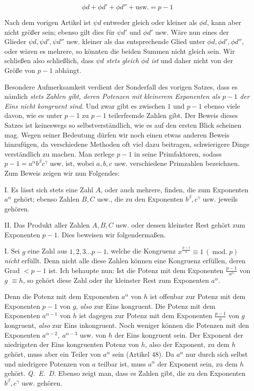 \[\phi d+\phi d'+\phi d''+\text{usw.}=p-1\]

Nach dem vorigen Artikel ist $\psi d$ entweder gleich oder kleiner als $\phi d$, kann aber nicht größer sein; ebenso gilt dies für $\psi d'$ und $\phi d'$ usw. Wäre nun eines der Glieder $\psi d,\psi d',\psi d''$ usw. kleiner als das entsprechende Glied unter $\phi d,\phi d',\phi d''$, oder wären es mehrere, so könnten die beiden Summen nicht gleich sein. Wir schließen also schließlich, dass $\psi d$ \emph{stets gleich $\phi d$ ist} und daher nicht von der Größe von $p-1$ abhängt.


Besondere Aufmerksamkeit verdient der Sonderfall des vorigen Satzes, dass es nämlich \emph{stets Zahlen gibt, deren Potenzen mit kleinerem Exponenten als $p-1$ der Eins nicht kongruent sind}. Und zwar gibt es zwischen $1$ und $p-1$ ebenso viele davon, wie es unter $p-1$ zu $p-1$ teilerfremde Zahlen gibt. Der Beweis dieses Satzes ist keineswegs so selbstverständlich, wie es auf den ersten Blick scheinen mag. Wegen seiner Bedeutung dürfen wir noch einen etwas anderen Beweis hinzufügen, da verschiedene Methoden oft viel dazu beitragen, schwierigere Dinge verständlich zu machen. Man zerlege $p-1$ in seine Primfaktoren, sodass $p-1=a^\alpha b^\beta c^\gamma$ usw. ist, wobei $a,b,c$ usw. verschiedene Primzahlen bezeichnen. Zum Beweis zeigen wir nun Folgendes:

I. Es lässt sich stets eine Zahl $A$, oder auch mehrere, finden, die zum Exponenten $a^\alpha$ gehört; ebenso Zahlen $B,C$ usw., die zu den Exponenten $b^\beta,c^\gamma$ usw. jeweils gehören.

II. Das Produkt aller Zahlen $A,B,C$ usw. oder dessen kleinster Rest gehört zum Exponenten $p-1$. Dies beweisen wir folgendermaßen.

I. Sei $g$ eine Zahl aus $1,2,3\ldots p-1$, welche die Kongruenz $x^{\frac{p-1}{a}}\equiv1\,(\operatorname{mod.}p)$ \emph{nicht} erfüllt. Denn nicht alle diese Zahlen können eine Kongruenz erfüllen, deren Grad $<p-1$ ist. Ich behaupte nun: Ist die Potenz mit dem Exponenten ${\frac{p-1}{a^\alpha}}$ von $g$ $\equiv h$, so gehört diese Zahl oder ihr kleinster Rest zum Exponenten $a^\alpha$.

Denn die Potenz mit dem Exponenten $a^{\alpha}$ von $h$ ist offenbar zur Potenz mit dem Exponenten $p-1$ von $g$, \emph{also} zur Eins kongruent. Die Potenz mit dem Exponenten $a^{\alpha-1}$ von $h$ ist dagegen zur Potenz mit dem Exponenten ${\frac{p-1}{a}}$ von $g$ kongruent, \emph{also} zur Eins inkongruent. Noch weniger können die Potenzen mit den Exponenten $a^{\alpha-2},\ a^{\alpha-3}$ usw. von $h$ der Eins kongruent sein. Der Exponent der niedrigsten der Eins kongruenten Potenz von $h$, also der Exponent, zu dem $h$ gehört, muss aber ein Teiler von $a^\alpha$ sein (Artikel 48). Da $a^\alpha$ nur durch sich selbst und niedrigere Potenzen von $a$ teilbar ist, muss $a^\alpha$ der Exponent sein, zu dem $h$ gehört. \mbox{\emph{Q. E. D.}} Ebenso zeigt man, dass es Zahlen gibt, die zu den Exponenten $b^\beta,c^\gamma$ usw. gehören.

